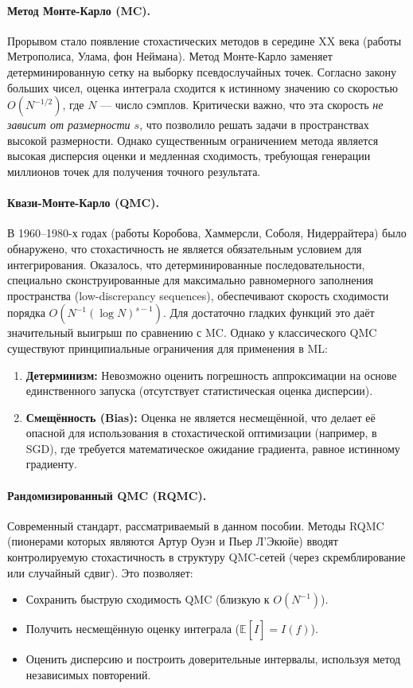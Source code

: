 \documentclass[12pt, a4paper]{article}
\theoremstyle{plain}
\theoremstyle{definition}
\theoremstyle{remark}
\newcommand{\E}{\mathbb{E}}
\begin{document}
\paragraph*{Метод Монте-Карло (MC).}
Прорывом стало появление стохастических методов в середине XX века (работы Метрополиса, Улама, фон Неймана). Метод Монте-Карло заменяет детерминированную сетку на выборку псевдослучайных точек. Согласно закону больших чисел, оценка интеграла сходится к истинному значению со скоростью $O(N^{-1/2})$, где $N$ --- число сэмплов. Критически важно, что эта скорость \textit{не зависит от размерности $s$}, что позволило решать задачи в пространствах высокой размерности. Однако существенным ограничением метода является высокая дисперсия оценки и медленная сходимость, требующая генерации миллионов точек для получения точного результата.

\paragraph*{Квази-Монте-Карло (QMC).}
В 1960--1980-х годах (работы Коробова, Хаммерсли, Соболя, Нидеррайтера) было обнаружено, что стохастичность не является обязательным условием для интегрирования. Оказалось, что детерминированные последовательности, специально сконструированные для максимально равномерного заполнения пространства (low-discrepancy sequences), обеспечивают скорость сходимости порядка $O(N^{-1} (\log N)^{s-1})$. Для достаточно гладких функций это даёт значительный выигрыш по сравнению с MC. Однако у классического QMC существуют принципиальные ограничения для применения в ML:
\begin{enumerate}
    \item \textbf{Детерминизм:} Невозможно оценить погрешность аппроксимации на основе единственного запуска (отсутствует статистическая оценка дисперсии).
    \item \textbf{Смещённость (Bias):} Оценка не является несмещённой, что делает её опасной для использования в стохастической оптимизации (например, в SGD), где требуется математическое ожидание градиента, равное истинному градиенту.
\end{enumerate}

\paragraph*{Рандомизированный QMC (RQMC).}
Современный стандарт, рассматриваемый в данном пособии. Методы RQMC (пионерами которых являются Артур Оуэн и Пьер Л'Экюйе) вводят контролируемую стохастичность в структуру QMC-сетей (через скремблирование или случайный сдвиг). Это позволяет:
\begin{itemize}
    \item Сохранить быструю сходимость QMC (близкую к $O(N^{-1})$).
    \item Получить несмещённую оценку интеграла ($\E[\hat{I}] = I(f)$).
    \item Оценить дисперсию и построить доверительные интервалы, используя метод независимых повторений.
\end{itemize}
\end{document}
